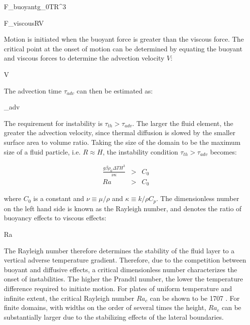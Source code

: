 \documentclass[10pt]{article}
\numberwithin{equation}{section} %
\begin{document}
\beq
F_{buoyant}\propto g\beta\rho_0\Delta TR^3
\eeq

\beq
F_{viscous}\pi \mu RV
\eeq

Motion is initiated when the buoyant force is greater than the viscous force. The critical point at the onset of motion can be determined by equating the buoyant and viscous forces to determine the advection velocity \(V\):

\beq
V\propto{}
\eeq

The advection time \(\tau_{adv}\) can then be estimated as:

\beq
\tau_{adv}\propto{}
\eeq

The requirement for instability is \(\tau_{th}>\tau_{adv}\). The larger the fluid element, the greater the advection velocity, since thermal diffusion is slowed by the smaller surface area to volume ratio. Taking the size of the domain to be the maximum size of a fluid particle, i.e. \(R\approx H\), the instability condition \(\tau_{th}>\tau_{adv}\) becomes:

\begin{subequations}
\begin{eqnarray}
\frac{g\beta\rho_0\Delta TH^3}{\nu \kappa}&>&C_0\\
Ra&>&C_0
\end{eqnarray}
\end{subequations}

where \(C_0\) is a constant and \(\nu\equiv\mu/\rho\) and \(\kappa\equiv k/\rho C_p\). The dimensionless number on the left hand side is known as the Rayleigh number, and denotes the ratio of buoyancy effects to viscous effects:

\beq
Ra\equiv{}
\eeq

The Rayleigh number therefore determines the stability of the fluid layer to a vertical adverse temperature gradient. Therefore, due to the competition between buoyant and diffusive effects, a critical dimensionless number characterizes the onset of instabilities. The higher the Prandtl number, the lower the temperature difference required to initiate motion. For plates of uniform temperature and infinite extent, the critical Rayleigh number \(Ra_c\) can be shown to be 1707 \cite{berge,sandberg}. For finite domains, with widths on the order of several times the height, \(Ra_c\) can be substantially larger due to the stabilizing effects of the lateral boundaries.
\end{document}
